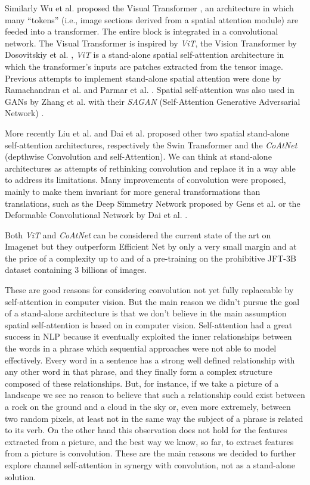 \documentclass[fleqn,10pt]{SelfArx}
\begin{document}
Similarly Wu et al. proposed the Visual Transformer \cite{wu2020visual}, an architecture in which many ``tokens'' (i.e., image sections derived from a spatial attention module) are feeded into a transformer. The entire block is integrated in a convolutional network.
The Visual Transformer is inspired by \textit{ViT}, the Vision Transformer by Dosovitskiy et al. \cite{dosovitskiy2020image}, \textit{ViT} is a stand-alone spatial self-attention architecture in which the transformer's inputs are patches extracted from the tensor image. Previous attempts to implement stand-alone spatial attention were done by Ramachandran et al. \cite{ramachandran2019stand} and Parmar et al. \cite{parmar2018image}. Spatial self-attention was also used in GANs by Zhang et al. with their \textit{SAGAN} (Self-Attention Generative Adversarial Network) \cite{zhang2019self}.

More recently Liu et al. and Dai et al. proposed other two spatial stand-alone self-attention architectures, respectively the Swin Transformer \cite{liu2021swin} and the \textit{CoAtNet} \cite{dai2021coatnet} (depthwise Convolution and self-Attention). We can think at stand-alone architectures as attempts of rethinking convolution and replace it in a way able to address its limitations. Many improvements of convolution were proposed, mainly to make them invariant for more general transformations than translations, such as the Deep Simmetry Network proposed by Gens et al. \cite{gens2014deep} or the Deformable Convolutional Network by Dai et al. \cite{dai2017deformable}.

Both \textit{ViT} and \textit{CoAtNet} can be considered the current state of the art on Imagenet but they outperform Efficient Net by only a very small margin \cite{pham2021meta} and at the price of a complexity up to  and of a pre-training on the prohibitive JFT-3B dataset containing 3 billions of images.

These are good reasons for considering convolution not yet fully replaceable by self-attention in computer vision. But the main reason we didn't pursue the goal of a stand-alone architecture is that we don't believe in the main assumption spatial self-attention is based on in computer vision. Self-attention had a great success in NLP because it eventually exploited the inner relationships between the words in a phrase which sequential approaches were not able to model effectively. Every word in a sentence has a strong well defined relationship with any other word in that phrase, and they finally form a complex structure composed of these relationships. But, for instance, if we take a picture of a landscape we see no reason to believe that such a relationship could exist between a rock on the ground and a cloud in the sky or, even more extremely, between two random pixels, at least not in the same way the subject of a phrase is related to its verb.
On the other hand this observation does not hold for the features extracted from a picture, and the best way we know, so far, to extract features from a picture is convolution. These are the main reasons we decided to further explore channel self-attention in synergy with convolution, not as a stand-alone solution.
\end{document}
